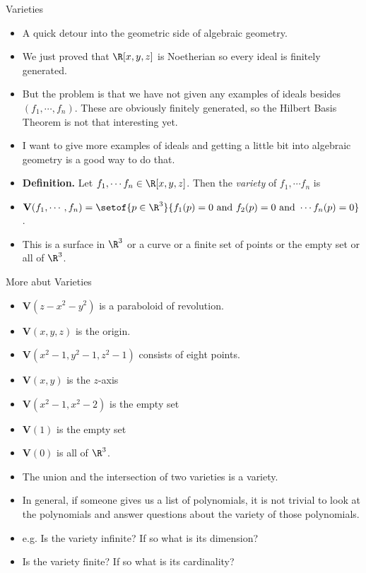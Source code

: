 \documentclass[handout]{beamer}
\begin{document}
\begin{frame}{Varieties}

\begin{itemize}
  \item A quick detour into the geometric side of algebraic geometry.
  \item We just proved that $\R[x,y,z]$ is Noetherian so every ideal is finitely generated.
  \item But the problem is that we have not given any examples of ideals besides $(f_1,\cdots, f_n)$. These are obviously finitely generated,
  so the Hilbert Basis Theorem is not that interesting yet.
  \item I want to give more examples of ideals and getting a little bit into algebraic geometry is a good way to do that.
  \item \textbf{Definition.} Let $f_1,\cdots f_n \in \R[x,y,z]$. Then the \emph{variety} of $f_1,\cdots f_n$ is
  \item $\mathbf{V}(f_1,\cdots,f_n) = \setof{p\in\R^3}{f_1(p)=0 \text{ and } f_2(p)=0 \text{ and } \cdots f_n(p)=0}$.
  \item This is a surface in $\R^3$ or a curve or a finite set of points or the empty set or all of $\R^3$.
\end{itemize}
\end{frame}



\begin{frame}{More abut Varieties}

\begin{itemize}
  \item $\mathbf{V}(z-x^2-y^2)$ is a paraboloid of revolution.
  \item $\mathbf{V}(x,y,z)$ is the origin.
  \item $\mathbf{V}(x^2-1,y^2-1,z^2-1)$ consists of eight points.
  \item $\mathbf{V}(x,y)$ is the $z$-axis
  \item $\mathbf{V}(x^2 - 1,x^2 - 2)$ is the empty set
  \item $\mathbf{V}(1)$ is the empty set
  \item $\mathbf{V}(0)$ is all of $\R^3$.
  \item The union and the intersection of two varieties is a variety.
  \item In general, if someone gives us a list of polynomials, it is not trivial to look at the polynomials and
  answer questions about the variety of those polynomials.
  \item e.g. Is the variety infinite? If so what is its dimension?
  \item Is the variety finite? If so what is its cardinality?

\end{itemize}
\end{frame}
\end{document}
